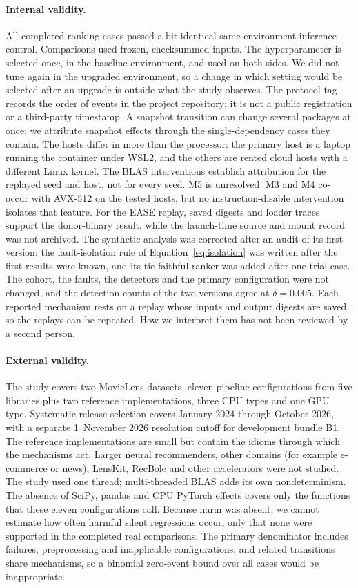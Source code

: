 \documentclass[11pt,a4paper]{article}
\begin{document}
\paragraph{Internal validity.} All completed ranking cases passed a
bit-identical same-environment inference control. Comparisons used frozen,
checksummed inputs. The hyperparameter is selected once, in the baseline
environment, and used on both sides. We did not tune again in the upgraded
environment, so a change in which setting would be selected after an upgrade
is outside what the study observes. The protocol tag records the order of
events in the project repository; it is not a public registration or a
third-party timestamp. A snapshot
transition can change several packages at once; we attribute snapshot effects
through the single-dependency cases they contain. The hosts differ in more
than the processor: the primary host is a laptop running the container under
WSL2, and the others are rented cloud hosts with a different Linux kernel.
The BLAS interventions
establish attribution for the replayed seed and host, not for every seed.
M5 is unresolved. M3 and M4 co-occur with AVX-512 on the tested hosts, but no
instruction-disable intervention isolates that feature. For the EASE replay,
saved digests and loader traces support the donor-binary result, while the
launch-time source and mount record was not archived. The synthetic analysis
was corrected after an audit of its first version: the fault-isolation rule of
Equation~\eqref{eq:isolation} was written after the first results were known,
and its tie-faithful ranker was added after one trial case. The cohort, the
faults, the detectors and the primary configuration were not changed, and the
detection counts of the two versions agree at $\delta=0.005$. Each reported
mechanism rests on a replay whose inputs and output digests are saved, so the
replays can be repeated. How we interpret them has not been reviewed by a
second person.

\paragraph{External validity.} The study covers two MovieLens datasets, eleven
pipeline configurations from five libraries plus two reference
implementations, three CPU types and one GPU type. Systematic release
selection covers January 2024 through October 2026, with a separate
1~November 2026 resolution cutoff for development bundle B1. The reference implementations are small but contain the
idioms through which the mechanisms act. Larger neural recommenders, other
domains (for example e-commerce or news), LensKit, RecBole and other
accelerators were not studied. The study used one thread; multi-threaded BLAS
adds its own nondeterminism. The absence of SciPy, pandas and CPU PyTorch
effects covers only the functions that these eleven configurations call.
Because harm was absent, we cannot estimate how
often harmful silent regressions occur, only that none were supported in the
completed real comparisons. The primary denominator includes failures,
preprocessing and inapplicable configurations, and related transitions share
mechanisms, so a binomial zero-event bound over all \nCases{} cases would be
inappropriate.
\end{document}
